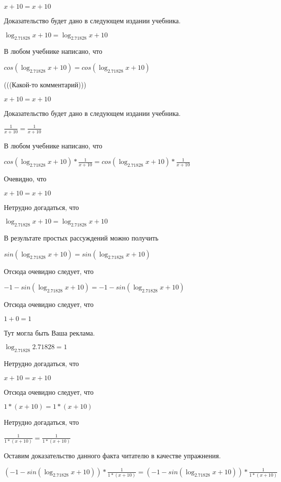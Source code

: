 \documentclass[12pt,a4paper,fleqn]{article}
\theoremstyle{definition}
\begin{document}
$ x  +  10  =  x  +  10 $

Доказательство будет дано в следующем издании учебника.

$\log_{ 2.71828 }{ x  +  10 } = \log_{ 2.71828 }{ x  +  10 }$

В любом учебнике написано, что

$cos(\log_{ 2.71828 }{ x  +  10 }) = cos(\log_{ 2.71828 }{ x  +  10 })$

(((Какой-то комментарий)))

$ x  +  10  =  x  +  10 $

Доказательство будет дано в следующем издании учебника.

$\frac{ 1 }{ x  +  10 }
 = \frac{ 1 }{ x  +  10 }
$

В любом учебнике написано, что

$cos(\log_{ 2.71828 }{ x  +  10 }) * \frac{ 1 }{ x  +  10 }
 = cos(\log_{ 2.71828 }{ x  +  10 }) * \frac{ 1 }{ x  +  10 }
$

Очевидно, что

$ x  +  10  =  x  +  10 $

Нетрудно догадаться, что

$\log_{ 2.71828 }{ x  +  10 } = \log_{ 2.71828 }{ x  +  10 }$

В результате простых рассуждений можно получить

$sin(\log_{ 2.71828 }{ x  +  10 }) = sin(\log_{ 2.71828 }{ x  +  10 })$

Отсюда очевидно следует, что

$ -1  - sin(\log_{ 2.71828 }{ x  +  10 }) =  -1  - sin(\log_{ 2.71828 }{ x  +  10 })$

Отсюда очевидно следует, что

$ 1  +  0  =  1 $

Тут могла быть Ваша реклама.

$\log_{ 2.71828 }{ 2.71828 } =  1 $

Нетрудно догадаться, что

$ x  +  10  =  x  +  10 $

Отсюда очевидно следует, что

$ 1  * ( x  +  10 ) =  1  * ( x  +  10 )$

Нетрудно догадаться, что

$\frac{ 1 }{ 1  * ( x  +  10 )}
 = \frac{ 1 }{ 1  * ( x  +  10 )}
$

Оставим доказательство данного факта читателю в качестве упражнения.

$( -1  - sin(\log_{ 2.71828 }{ x  +  10 })) * \frac{ 1 }{ 1  * ( x  +  10 )}
 = ( -1  - sin(\log_{ 2.71828 }{ x  +  10 })) * \frac{ 1 }{ 1  * ( x  +  10 )}
$
\end{document}
